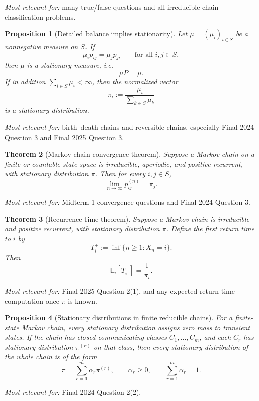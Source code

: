 \documentclass[11pt]{article}
\newtheorem{theorem}{Theorem}[section]
\newtheorem{proposition}[theorem]{Proposition}
\theoremstyle{definition}
\begin{document}
\emph{Most relevant for:} many true/false questions and all irreducible-chain classification problems.

\begin{proposition}[Detailed balance implies stationarity]
Let $\mu=(\mu_i)_{i\in S}$ be a nonnegative measure on $S$. If
\[
\mu_i p_{ij} = \mu_j p_{ji}
\qquad \text{for all } i,j\in S,
\]
then $\mu$ is a stationary measure, i.e.
\[
\mu P = \mu.
\]
If in addition $\sum_{i\in S} \mu_i < \infty$, then the normalized vector
\[
\pi_i := \frac{\mu_i}{\sum_{k\in S} \mu_k}
\]
is a stationary distribution.
\end{proposition}

\emph{Most relevant for:} birth--death chains and reversible chains, especially Final 2024 Question 3 and Final 2025 Question 3.

\begin{theorem}[Markov chain convergence theorem]
Suppose a Markov chain on a finite or countable state space is irreducible, aperiodic, and positive recurrent, with stationary distribution $\pi$. Then for every $i,j\in S$,
\[
\lim_{n\to\infty} p_{ij}^{(n)} = \pi_j.
\]
\end{theorem}

\emph{Most relevant for:} Midterm 1 convergence questions and Final 2024 Question 3.

\begin{theorem}[Recurrence time theorem]
Suppose a Markov chain is irreducible and positive recurrent, with stationary distribution $\pi$. Define the first return time to $i$ by
\[
T_i^+ := \inf\{n\ge 1:X_n=i\}.
\]
Then
\[
\mathbb E_i[T_i^+] = \frac{1}{\pi_i}.
\]
\end{theorem}

\emph{Most relevant for:} Final 2025 Question 2(1), and any expected-return-time computation once $\pi$ is known.

\begin{proposition}[Stationary distributions in finite reducible chains]
For a finite-state Markov chain, every stationary distribution assigns zero mass to transient states. If the chain has closed communicating classes $C_1,\dots,C_m$, and each $C_r$ has stationary distribution $\pi^{(r)}$ on that class, then every stationary distribution of the whole chain is of the form
\[
\pi = \sum_{r=1}^m \alpha_r \pi^{(r)},
\qquad
\alpha_r\ge 0,
\qquad
\sum_{r=1}^m \alpha_r=1.
\]
\end{proposition}

\emph{Most relevant for:} Final 2024 Question 2(2).
\end{document}
